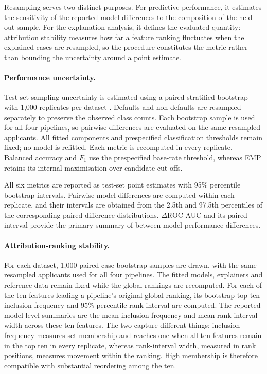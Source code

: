 Resampling serves two distinct purposes. For predictive performance, it estimates the
sensitivity of the reported model differences to the composition of the held-out
sample. For the explanation analysis, it defines the evaluated quantity: attribution
stability measures how far a feature ranking fluctuates when the explained cases are
resampled, so the procedure constitutes the metric rather than bounding the uncertainty
around a point estimate.

\paragraph{Performance uncertainty.}
Test-set sampling uncertainty is estimated using a paired stratified bootstrap with
1{,}000 replicates per dataset \citep{raschkaModelEvaluationModel2020}. Defaults and
non-defaults are resampled separately to preserve the observed class counts. Each
bootstrap sample is used for all four pipelines, so pairwise differences are evaluated
on the same resampled applicants. All fitted components and prespecified classification
thresholds remain fixed; no model is refitted. Each metric is recomputed in every
replicate. Balanced accuracy and $F_1$ use the prespecified base-rate threshold, whereas
EMP retains its internal maximisation over candidate cut-offs.

All six metrics are reported as test-set point estimates with 95\% percentile
bootstrap intervals. Pairwise model differences are computed within each replicate, and
their intervals are obtained from the 2.5th and 97.5th percentiles of the corresponding
paired difference distributions. $\Delta$ROC-AUC and its paired interval provide the
primary summary of between-model performance differences.

\paragraph{Attribution-ranking stability.}
For each dataset, 1{,}000 paired case-bootstrap samples are drawn, with the same
resampled applicants used for all four pipelines. The fitted models, explainers and
reference data remain fixed while the global rankings are recomputed. For each of the
ten features leading a pipeline's original global ranking, its bootstrap top-ten
inclusion frequency and 95\% percentile rank interval are computed.
The reported model-level summaries are the mean inclusion frequency and mean
rank-interval width across these ten features. The two capture different things:
inclusion frequency measures set membership and reaches one when all ten features
remain in the top ten in every replicate, whereas rank-interval width, measured in
rank positions, measures movement within the ranking. High membership is therefore
compatible with substantial reordering among the ten.

